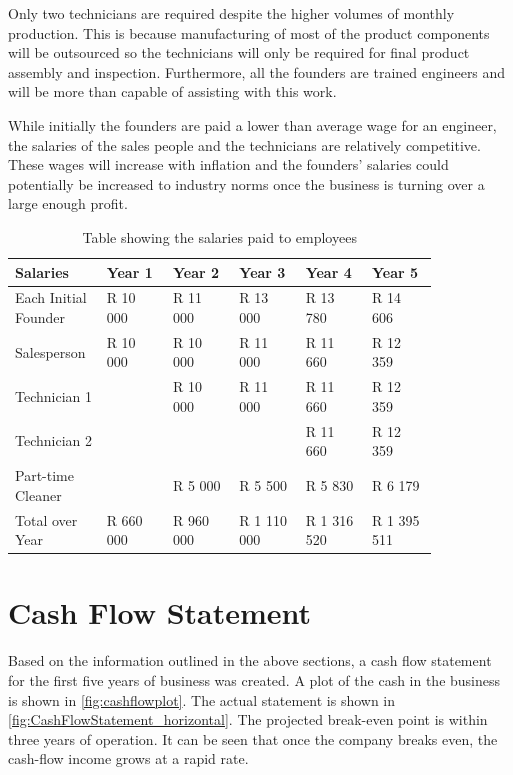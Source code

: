 Only two technicians are required despite the higher volumes of monthly production. This is because manufacturing of most of the product components will be outsourced so the technicians will only be required for final product assembly and inspection. Furthermore, all the founders are trained engineers and will be more than capable of assisting with this work.

While initially the founders are paid a lower than average wage for an engineer, the salaries of the sales people and the technicians are relatively competitive. These wages will increase with inflation and the founders' salaries could potentially be increased to industry norms once the business is turning over a large enough profit.

\begin{table}[htbp]
  \centering
  \caption{Table showing the salaries paid to employees}
    \begin{tabular}{k{0.14\linewidth}R{0.14\linewidth}R{0.14\linewidth}R{0.14\linewidth}R{0.14\linewidth}R{0.14\linewidth}}
    \toprule
    Salaries & Year 1 & Year 2 & Year 3 & Year 4 & Year 5 \\
    \midrule
    \raggedright{Each Initial Founder} & R 10 000 & R 11 000 & R 13 000 & R 13 780 & R 14 606 \\
    Salesperson & R 10 000 & R 10 000 & R 11 000 & R 11 660 & R 12 359 \\
    Technician 1 &       & R 10 000 & R 11 000 & R 11 660 & R 12 359 \\
    Technician 2 &       &       &       & R 11 660 & R 12 359 \\
    \raggedright{Part-time Cleaner}&       & R 5 000 & R 5 500 & R 5 830 & R 6 179 \\
    \midrule
    \raggedright{Total over Year} & R 660 000 & R 960 000 & R 1 110 000 & R 1 316 520 & R 1 395 511 \\
    \bottomrule
    \end{tabular}%
  \label{tab:salaries}%
\end{table}%

\newpage
\section{Cash Flow Statement}
Based on the information outlined in the above sections, a cash flow statement for the first five years of business was created. A plot of the cash in the business is shown in \cref{fig:cashflowplot}. The actual statement is shown in \cref{fig:CashFlowStatement_horizontal}. The projected break-even point is within three years of operation. It can be seen that once the company breaks even, the cash-flow income grows at a rapid rate.

